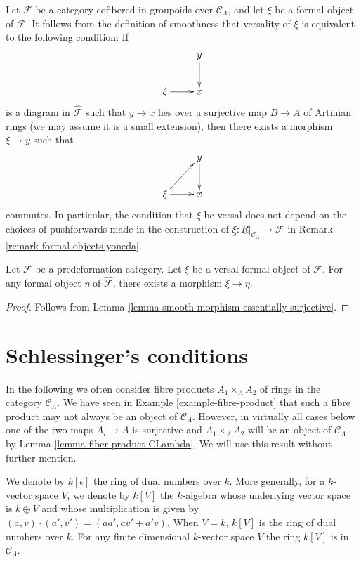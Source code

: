 \begin{remark}
\label{remark-versal-object}
Let $\mathcal{F}$ be a category cofibered in groupoids over $\mathcal 
C_\Lambda$, and let $\xi$ be a formal object of $\mathcal{F}$.  It follows 
from the definition of smoothness that versality of $\xi$ is equivalent to the 
following condition: If 
$$
\xymatrix{
& y \ar[d] \\
\xi \ar[r] & x
}
$$
is a diagram in $\widehat{\mathcal{F}}$ such that $y \to x$ lies over a 
surjective map $B \to A$ of Artinian rings (we may assume it is a small 
extension),  then there exists a morphism $\xi \to y$ such that
$$
\xymatrix{
& y \ar[d] \\
\xi \ar[r] \ar[ur] & x
}
$$ 
commutes. In particular, the condition that $\xi$ be versal does not depend on 
the choices of pushforwards made in the construction of
$\underline{\xi} : \underline{R}|_{\mathcal{C}_\Lambda} \to \mathcal{F}$ in
Remark \ref{remark-formal-objects-yoneda}.
\end{remark}

\begin{lemma}
\label{lemma-versal-object-quasi-initial}
Let $\mathcal{F}$ be a predeformation category.
Let $\xi$ be a versal formal object of $\mathcal{F}$.
For any formal object $\eta$ of $\widehat{\mathcal{F}}$,
there exists a morphism $\xi \to \eta$.
\end{lemma}

\begin{proof}
Follows from Lemma \ref{lemma-smooth-morphism-essentially-surjective}.
\end{proof}






\section{Schlessinger's conditions}
\label{section-schlessinger-conditions}

\noindent
In the following we often consider fibre products $A_1 \times_A A_2$
of rings in the category $\mathcal{C}_\Lambda$. We have seen in
Example \ref{example-fibre-product}
that such a fibre product may not always be an object of
$\mathcal{C}_\Lambda$. However, in virtually all cases below one of the
two maps $A_i \to A$ is surjective and $A_1 \times_A A_2$ will be
an object of $\mathcal{C}_\Lambda$ by
Lemma \ref{lemma-fiber-product-CLambda}.
We will use this result without further mention.

\medskip\noindent
We denote by $k[\epsilon]$ the ring of dual numbers over $k$.  More 
generally, for a $k$-vector space $V$, we denote by $k[V]$ the $k$-algebra 
whose underlying vector space is $k \oplus V$ and whose multiplication is given 
by $(a,v) \cdot (a',v') = (aa', av' + a'v)$.  When $V = k$, $k[V]$ is the ring 
of dual numbers over $k$.  For any finite dimensional $k$-vector space $V$
the ring $k[V]$ is in $\mathcal{C}_\Lambda$.


